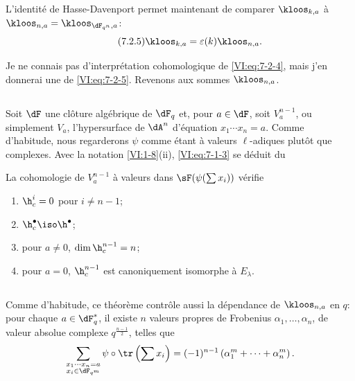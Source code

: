 L'identité de Hasse-Davenport permet maintenant de comparer $\kloos_{k,a}$ 
à $\kloos_{n,a} = \kloos_{\dF_{q^n},a}$: 
\begin{equation*}\tag{7.2.5}\label{VI:eq:7-2-5}
  \kloos_{k,a} = \varepsilon(k) \kloos_{n,a} \text{.} 
\end{equation*}

Je ne connais pas d'interprétation cohomologique de \eqref{VI:eq:7-2-4}, mais 
j'en donnerai une de \eqref{VI:eq:7-2-5}. Revenons aux sommes $\kloos_{n,a}$. 





\subsection{}\label{VI:7-3}

Soit $\dF$ une clôture algébrique de $\dF_q$ et, pour $a\in \dF$, soit 
$V_a^{n-1}$, ou simplement $V_a$, l'hypersurface de $\dA^n$ d'équation 
$x_1 \dotsm x_n=a$. Comme d'habitude, nous regarderons $\psi$ comme étant à 
valeurs $\ell$-adiques plutôt que complexes. Avec la notation 
\ref{VI:1-8}(ii), \eqref{VI:eq:7-1-3} se déduit du 





\begin{theorem_}\label{VI:7-4}
La cohomologie de $V_a^{n-1}$ à valeurs dans $\sF(\psi(\sum x_i))$ vérifie 
\begin{enumerate}[\indent (i)]
  \item $\h_c^i=0$ pour $i\ne n-1$; 
  \item $\h_c^\bullet{} \iso \h^\bullet{}$; 
  \item pour $a\ne 0$, $\dim \h_c^{n-1}{}=n$; 
\item pour $a=0$, $\h_c^{n-1}{}$ est canoniquement isomorphe à $E_\lambda$. 
\end{enumerate}
\end{theorem_}





\subsection{}\label{VI:7-5}

Comme d'habitude, ce théorème contrôle aussi la dépendance de 
$\kloos_{n,a}$ en $q$: pour chaque $a\in \dF_q^\ast$, il existe $n$ valeurs 
propres de Frobenius $\alpha_1,\dots,\alpha_n$, de valeur absolue complexe 
$q^{\frac{n-1}{2}}$, telles que 
\[
  \sum_{\substack{x_1\dotsm x_n = a \\ x_i\in \dF_{q^m}}} \psi\circ \tr\left(\sum x_i\right) = (-1)^{n-1} \left(\alpha_1^m + \cdots + \alpha_n^m \right) \text{.} 
\]

